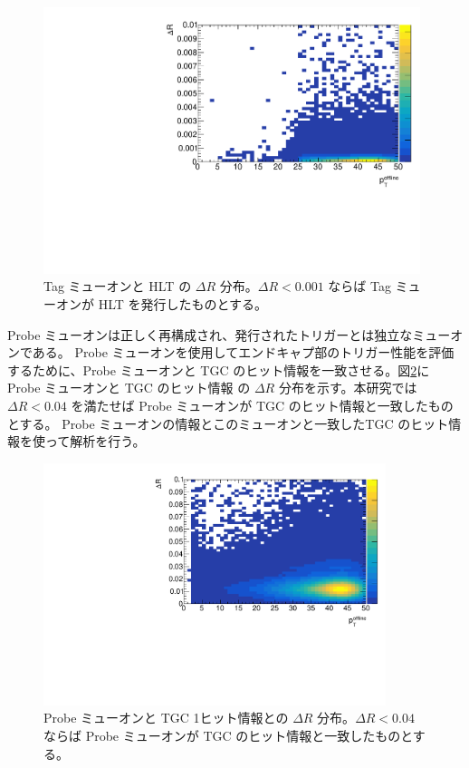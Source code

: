 \begin{figure}[tb]
  \centering
  \includegraphics[clip, width=11cm]{fig/3/dR_tag_HLT.pdf}
  \caption{Tag ミューオンと HLT の $\Delta R$ 分布。$\Delta R < 0.001$ ならば Tag ミューオンが HLT を発行したものとする。}
  \label{fig:tag_HLT}
\end{figure}

Probe ミューオンは正しく再構成され、発行されたトリガーとは独立なミューオンである。
Probe ミューオンを使用してエンドキャプ部のトリガー性能を評価するために、Probe ミューオンと TGC のヒット情報を一致させる。図\ref{fig:Probe_TGC}に Probe ミューオンと TGC のヒット情報 の $\Delta R$ 分布を示す。本研究では$\Delta R < 0.04$ を満たせば Probe ミューオンが TGC のヒット情報と一致したものとする。
Probe ミューオンの情報とこのミューオンと一致したTGC のヒット情報を使って解析を行う。

\begin{figure}[tb]
  \centering
  \includegraphics[clip, width=10cm]{fig/3/dR_probe_RoI.pdf}
  \caption{Probe ミューオンと TGC 1ヒット情報との $\Delta R$ 分布。$\Delta R < 0.04$ ならば Probe ミューオンが TGC のヒット情報と一致したものとする。}
  \label{fig:Probe_TGC}
\end{figure}



